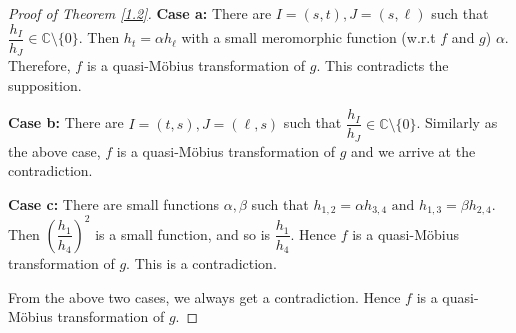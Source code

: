 \documentclass[10pt,a4paper]{amsart}
\newcommand{\C}{{\mathbb{C}}}
\begin{document}
\begin{proof}[Proof of Theorem \ref{1.2}]
\textbf{Case a:} There are $I=(s,t), J=(s,\ell)$ such that $\dfrac{h_I}{h_J}\in\C\setminus\{0\}$. Then $h_t=\alpha h_\ell$ with a small meromorphic function (w.r.t $f$ and $g$) $\alpha$. Therefore, $f$ is a quasi-M\"{o}bius  transformation of $g$. This contradicts the supposition.

\textbf{Case b:} There are $I=(t,s), J=(\ell,s)$ such that $\dfrac{h_I}{h_J}\in\C\setminus\{0\}$.  Similarly as the above case, $f$ is a quasi-M\"{o}bius  transformation of $g$ and we arrive at the contradiction. 

\textbf{Case c:} There are small functions $\alpha,\beta$ such that $h_{1,2}=\alpha h_{3,4}\text{ and } h_{1,3}=\beta h_{2,4}.$
Then $\left(\dfrac{h_1}{h_4}\right)^{2}$ is a small function, and so is $\dfrac{h_1}{h_4}$. Hence $f$ is a quasi-M\"{o}bius transformation of $g$. This is a contradiction.

From the above two cases, we always get a contradiction. Hence $f$ is a quasi-M\"{o}bius transformation of $g$. 
\end{proof}
\end{document}
